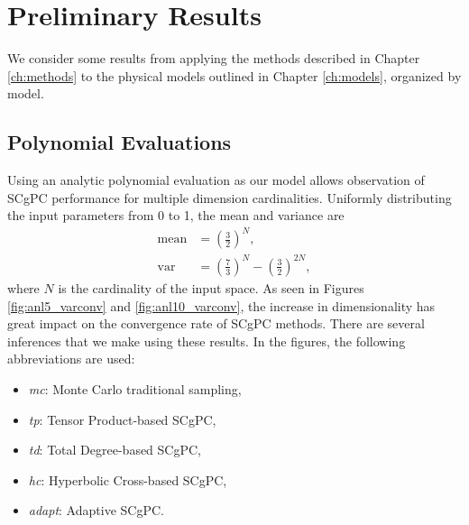 
\chapter{Preliminary Results} %

\label{ch:results} %


We consider some results from applying the methods described in Chapter \ref{ch:methods} to the physical
models outlined in Chapter \ref{ch:models}, organized by model.

\section{Polynomial Evaluations}
Using an analytic polynomial evaluation as our model allows observation of SCgPC performance for
multiple dimension cardinalities.  Uniformly distributing the input parameters from 0 to 1, the mean and variance are
\begin{align}
  \text{mean}&=\left(\frac{3}{2}\right)^N,\\
  \text{var}&=\left(\frac{7}{3}\right)^N-\left(\frac{3}{2}\right)^{2N},
\end{align}
where $N$ is the cardinality of the input space.  As seen in Figures \ref{fig:anl5_varconv} and
\ref{fig:anl10_varconv}, the increase in dimensionality has great impact on the convergence rate of SCgPC
methods.  There are several
inferences that we make using these results. In the figures, the following abbreviations are used:
\begin{itemize}
  \item \emph{mc}: Monte Carlo traditional sampling,
  \item \emph{tp}: Tensor Product-based SCgPC,
  \item \emph{td}: Total Degree-based SCgPC,
  \item \emph{hc}: Hyperbolic Cross-based SCgPC,
  \item \emph{adapt}: Adaptive SCgPC.
\end{itemize}

